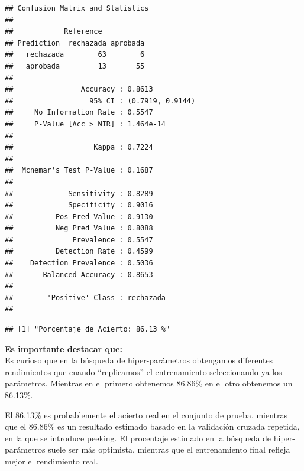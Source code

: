 \documentclass[
]{article}
\newenvironment{Shaded}{\begin{snugshade}}{\end{snugshade}}
\newcommand{\DecValTok}[1]{\textcolor[rgb]{0.00,0.00,0.81}{#1}}
\newcommand{\FunctionTok}[1]{\textcolor[rgb]{0.13,0.29,0.53}{\textbf{#1}}}
\newcommand{\NormalTok}[1]{#1}
\newcommand{\SpecialCharTok}[1]{\textcolor[rgb]{0.81,0.36,0.00}{\textbf{#1}}}
\newcommand{\StringTok}[1]{\textcolor[rgb]{0.31,0.60,0.02}{#1}}
\begin{document}
\begin{verbatim}
## Confusion Matrix and Statistics
## 
##            Reference
## Prediction  rechazada aprobada
##   rechazada        63        6
##   aprobada         13       55
##                                           
##                Accuracy : 0.8613          
##                  95% CI : (0.7919, 0.9144)
##     No Information Rate : 0.5547          
##     P-Value [Acc > NIR] : 1.464e-14       
##                                           
##                   Kappa : 0.7224          
##                                           
##  Mcnemar's Test P-Value : 0.1687          
##                                           
##             Sensitivity : 0.8289          
##             Specificity : 0.9016          
##          Pos Pred Value : 0.9130          
##          Neg Pred Value : 0.8088          
##              Prevalence : 0.5547          
##          Detection Rate : 0.4599          
##    Detection Prevalence : 0.5036          
##       Balanced Accuracy : 0.8653          
##                                           
##        'Positive' Class : rechazada       
## 
\end{verbatim}

\begin{Shaded}
\end{Shaded}

\begin{verbatim}
## [1] "Porcentaje de Acierto: 86.13 %"
\end{verbatim}

\textbf{Es importante destacar que:\\
}Es curioso que en la búsqueda de hiper-parámetros obtengamos diferentes
rendimientos que cuando ``replicamos'' el entrenamiento seleccionando ya
los parámetros. Mientras en el primero obtenemos 86.86\% en el otro
obtenemos un 86.13\%.

El 86.13\% es probablemente el acierto real en el conjunto de prueba,
mientras que el 86.86\% es un resultado estimado basado en la validación
cruzada repetida, en la que se introduce peeking. El procentaje estimado
en la búsqueda de hiper-parámetros suele ser más optimista, mientras que
el entrenamiento final refleja mejor el rendimiento real.
\end{document}
